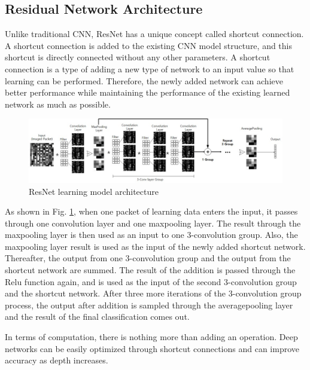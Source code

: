 \subsection{Residual Network Architecture}
Unlike traditional CNN, ResNet \cite{DBLP:journals:corr:HeZRS15} has a unique concept called shortcut connection.
A shortcut connection is added to the existing CNN model structure, and this shortcut is directly connected without any other parameters.
A shortcut connection is a type of adding a new type of network to an input value so that learning can be performed.
Therefore, the newly added network can achieve better performance while maintaining the performance of the existing learned network as much as possible.

\begin{figure}[t]
\centering
\setlength{\abovecaptionskip}{0pt}
\setlength{\belowcaptionskip}{0pt}
{
\includegraphics[scale=0.55]{fig4.jpg}
\caption{ResNet learning model architecture}
\label{fig4}
}
\end{figure}

As shown in Fig. \ref{fig4}, when one packet of learning data enters the input, it passes through one convolution layer and one maxpooling layer.
The result through the maxpooling layer is then used as an input to one 3-convolution group.
Also, the maxpooling layer result is used as the input of the newly added shortcut network.
Thereafter, the output from one 3-convolution group and the output from the shortcut network are summed.
The result of the addition is passed through the Relu function again, and is used as the input of the second 3-convolution group and the shortcut network.
After three more iterations of the 3-convolution group process, the output after addition is sampled through the averagepooling layer and the result of the final classification comes out.

In terms of computation, there is nothing more than adding an operation.
Deep networks can be easily optimized through shortcut connections and can improve accuracy as depth increases.

